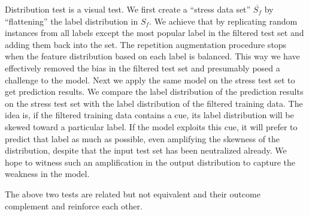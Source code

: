 Distribution test is a visual test. We first create a ``stress data set'' $\overline{S_f}$
by ``flattening'' the label distribution in $S_f$.  
We achieve that by replicating random instances from all labels 
except the most popular label in the filtered test
set and adding them back into the set. 
The repetition augmentation procedure stops when 
the feature distribution based on each label is balanced.
This way we have effectively removed the bias 
in the filtered test set and presumably 
posed a challenge to the model. 
Next we apply the same model on the stress test set 
to get prediction results. 
We compare the label distribution of the prediction results on 
the stress test set with the label distribution of 
the filtered training data.
The idea is, if the filtered training data contains a cue, 
its label distribution will be skewed toward a particular label.
If the model exploits this cue, it will prefer to predict
that label as much as possible, even amplifying the skewness
of the distribution, despite that the input test set has been
neutralized already. We hope to witness such an amplification
in the output distribution to capture
the weakness in the model.

The above two tests are related but not equivalent
and their outcome complement and reinforce each other. 


